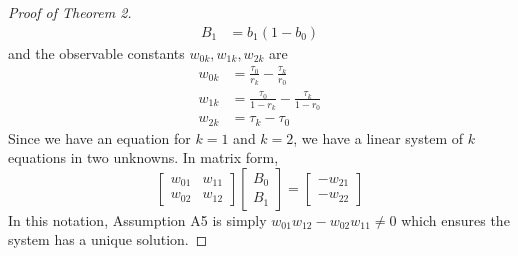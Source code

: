 \documentclass[12pt]{article}
\begin{document}
\begin{proof}[Proof of Theorem 2]
\begin{align*}
  B_1 &= b_1(1- b_0)
\end{align*}
and the observable constants $w_{0k}, w_{1k}, w_{2k}$ are
\begin{align*}
  w_{0k} &= \frac{\tau_0}{r_k} - \frac{\tau_k}{r_0}\\
  w_{1k} &= \frac{\tau_0}{1 - r_k} - \frac{\tau_k}{1 - r_0}\\
  w_{2k} &= \tau_k - \tau_0
\end{align*}
Since we have an equation for $k=1$ and $k=2$, we have a linear system of $k$ equations in two unknowns.
In matrix form, 
\[
\left[\begin{array}{cc}
w_{01} & w_{11}\\
w_{02} & w_{12}
\end{array}\right]\left[\begin{array}{c}
B_{0}\\
B_{1}
\end{array}\right]=\left[\begin{array}{c}
-w_{21}\\
-w_{22}
\end{array}\right]
\]
In this notation, Assumption A5 is simply $w_{01}w_{12}-w_{02}w_{11}\neq0$ which ensures the system has a unique solution.


\end{proof}
\end{document}
